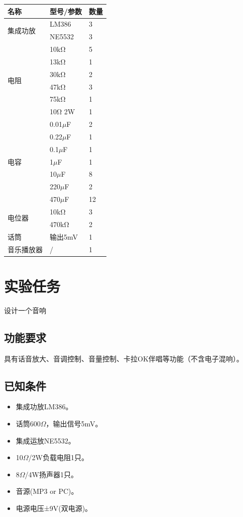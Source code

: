\documentclass[a4paper,11pt,UTF8]{article}
\numberwithin{equation}{subsection}
\begin{document}
\begin{table}[H]
	\centering
	\begin{tabular}{|p{}|p{}|p{}|}
		\hline
		名称 & 型号/参数 & 数量\\
		\hline
		\multirow{2}{*}{集成功放} & LM386
		 & 3\\
		 \cline{2-3}
		& NE5532 & 3\\
		\hline
		\multirow{6}{*}{电阻} & 10$\mathrm{k\Omega}$ & 5 \\
		\cline{2-3}
		 & 13$\mathrm{k\Omega}$ & 1 \\
		\cline{2-3}
		 & 30$\mathrm{k\Omega}$ & 2 \\
		\cline{2-3}
		 & 47$\mathrm{k\Omega}$ & 3 \\
		\cline{2-3}
		 & 75$\mathrm{k\Omega}$ & 1 \\
		\cline{2-3}
		 & 10$\mathrm{\Omega}$ 2W & 1 \\
		\hline
		\multirow{7}{*}{电容} & 0.01$\mu$F & 2 \\
		\cline{2-3}
		& 0.22$\mu$F & 1 \\
		\cline{2-3}
		&0.1$\mu$F & 1 \\
		\cline{2-3}
		& 1$\mu$F & 1\\
		\cline{2-3}
		& 10$\mu$F & 8 \\
		\cline{2-3}
		& 220$\mu$F & 2 \\
		\cline{2-3}
		& 470$\mu$F & 12 \\
		\cline{2-3}
		\hline 	
		\multirow{2}{*}{电位器} & 10$\mathrm{k\Omega}$ & 	3\\
		\cline{2-3}
		& 470$\mathrm{k\Omega}$ & 	2\\
		\hline
		话筒&输出5mV&1\\
		\hline
		音乐播放器&/&1\\
		\hline
	\end{tabular}
\end{table}
\section{实验任务}
设计一个音响
\subsection{功能要求}
具有话音放大、音调控制、音量控制、卡拉OK伴唱等功能（不含电子混响）。
\subsection{已知条件}
\begin{itemize}
	\setlength{\itemsep}{0pt}
	\item 集成功放LM386。
	\item 话筒600$\Omega$，输出信号5mV。
	\item 集成运放NE5532。
	\item 10$\Omega$/2W负载电阻1只。
	\item 8$\Omega$/4W扬声器1只。
	\item 音源(MP3 or PC)。
	\item 电源电压±9V(双电源)。	
\end{itemize}
\end{document}
